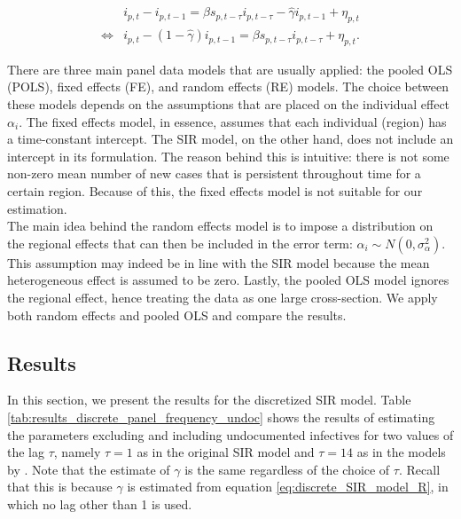 \documentclass[12pt]{article}
\begin{document}
\begin{appendices}
    	    \begin{equation} \label{eq:discrete_SIR_model_I_twostep}
    	        \begin{split}
            		& i_{p,t} - i_{p,t-1} = \beta s_{p,t-\tau}i_{p,t-\tau} - \hat{\gamma} i_{p,t-1} + \eta_{p,t} \\
        	        \iff & i_{p,t} - \left(1 - \hat{\gamma}\right) i_{p,t-1} = \beta s_{p,t-\tau}i_{p,t-\tau} + \eta_{p,t}.
        		\end{split}
    	    \end{equation}
	
	    There are three main panel data models that are usually applied: the pooled OLS (POLS), fixed effects (FE), and random effects (RE) models. The choice between these models depends on the assumptions that are placed on the individual effect $\alpha_i$. The fixed effects model, in essence, assumes that each individual (region) has a time-constant intercept. The SIR model, on the other hand, does not include an intercept in its formulation. The reason behind this is intuitive: there is not some non-zero mean number of new cases that is persistent throughout time for a certain region. Because of this, the fixed effects model is not suitable for our estimation. \\
    	
    	The main idea behind the random effects model is to impose a distribution on the regional effects that can then be included in the error term: $\alpha_i \sim N\left(0, \sigma^2_{\alpha}\right)$. This assumption may indeed be in line with the SIR model because the mean heterogeneous effect is assumed to be zero. Lastly, the pooled OLS model ignores the regional effect, hence treating the data as one large cross-section. We apply both random effects and pooled OLS and compare the results.
	
	    \subsection{Results} \label{sapp:discrete_sir_results}
		In this section, we present the results for the discretized SIR model. Table \ref{tab:results_discrete_panel_frequency_undoc} shows the results of estimating the parameters excluding and including undocumented infectives for two values of the lag $\tau$, namely $\tau = 1$ as in the original SIR model and $\tau = 14$ as in the models by \textcite{adda2016economic}. Note that the estimate of $\gamma$ is the same regardless of the choice of $\tau$. Recall that this is because $\gamma$ is estimated from equation \eqref{eq:discrete_SIR_model_R}, in which no lag other than 1 is used.
	

\end{appendices}
\end{document}
